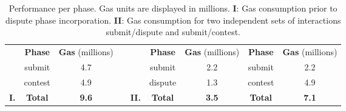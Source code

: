\begin{table}
\centering
\begin{tabular}{ccccccc|cc}
            & \textbf{Phase} & \textbf{Gas} (millions) &  &              & \textbf{Phase} & \textbf{Gas} (millions) & \textbf{Phase} & \textbf{Gas} (millions) \\ \cline{2-3} \cline{6-9}
 & submit  & 4.7 &  &  & submit  & 2.2 & submit  & 2.2 \\
 & contest & 4.9 &  &  & dispute & 1.3 & contest & 4.9 \\ \cline{2-3} \cline{6-9}
\textbf{I.} & \textbf{Total} & \textbf{9.6} &  & \textbf{II.} & \textbf{Total} & \textbf{3.5} & \textbf{Total} & \textbf{7.1}
\end{tabular}

\caption{Performance per phase. Gas units are displayed in millions.
\textbf{I}: Gas consumption prior to dispute phase incorporation. \textbf{II}:
Gas consumption for two independent sets of interactions submit/dispute and
submit/contest.}

\label{tab:dispute-cost}
\end{table}
